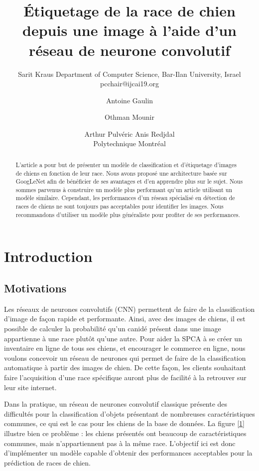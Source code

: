 \documentclass{article}
\title{Étiquetage de la race de chien depuis une image à l'aide d'un réseau de neurone convolutif}
\author{
    Sarit Kraus
    \affiliations
    Department of Computer Science, Bar-Ilan University, Israel \emails
    pcchair@ijcai19.org
}
\author{
Antoine Gaulin\and
Othman Mounir\and
Arthur Pulvéric\And
Anis Redjdal\\
\affiliations
Polytechnique Montréal\\
}
\begin{document}
\maketitle

\begin{abstract}
L'article a pour but de présenter un modèle de classification et d'étiquetage
d'images de chiens en fonction de leur race. Nous avons proposé une
architecture basée sur GoogLeNet afin de bénéficier de ses avantages et d'en
apprendre plus sur le sujet. Nous sommes parvenus à construire un modèle plus 
performant qu'un article utilisant un modèle similaire. Cependant, les
performances d'un réseau spécialisé en détection de races de chiens ne sont
toujours pas acceptables pour identifier les images. Nous recommandons
d'utiliser un modèle plus généraliste pour profiter de ses performances.

\end{abstract}

\section{Introduction}

\subsection{Motivations}
Les réseaux de neurones convolutifs (CNN) permettent de faire de la
classification d'image de façon rapide et performante. Ainsi, avec des images de
chiens, il est possible de calculer la probabilité qu'un canidé présent dans une
image appartienne à une race plutôt qu’une autre. Pour aider la SPCA à se créer
un inventaire en ligne de tous ses chiens, et encourager le commerce en ligne,
nous voulons concevoir un réseau de neurones qui permet de faire de la
classification automatique à partir des images de chien. De cette façon, les
clients souhaitant faire l'acquisition d'une race spécifique auront plus de
facilité à la retrouver sur leur site internet.

Dans la pratique, un réseau de neurones convolutif classique présente des
difficultés pour la classification d’objets présentant de nombreuses
caractéristiques communes, ce qui est le cas pour les chiens de la base de 
données. La figure \ref{1} illustre bien ce problème : les chiens présentés ont
beaucoup de caractéristiques communes, mais n’appartiennent pas à la même race.
L’objectif ici est donc d’implémenter un modèle capable d’obtenir des
performances acceptables pour la prédiction de races de chien.
\end{document}
